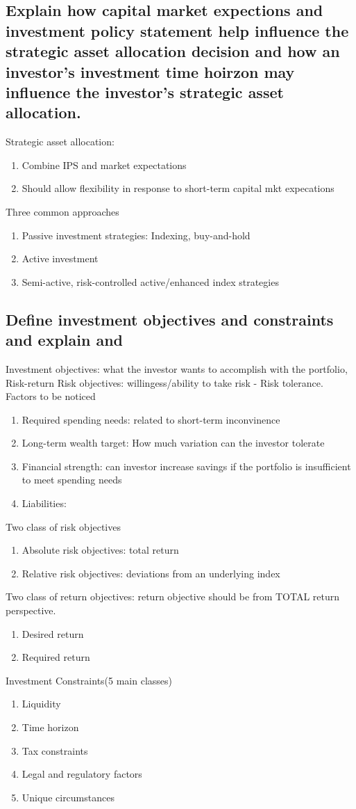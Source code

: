\documentclass{article}
\newcommand{\be}{\begin{enumerate}}
\newcommand{\ee}{\end{enumerate}}
\begin{document}
\subsection{Explain how capital market expections and investment policy statement help
influence the strategic asset allocation decision and how an investor's investment time
hoirzon may influence the investor's strategic asset allocation.}
Strategic asset allocation:
\be
    \item Combine IPS and market expectations
    \item Should allow flexibility in response to short-term capital mkt  expecations
\ee
Three common approaches
\be
    \item Passive investment strategies: Indexing, buy-and-hold
    \item Active investment
    \item Semi-active, risk-controlled active/enhanced index strategies
\ee
\subsection{Define investment objectives and constraints and explain and }
Investment objectives: what the investor wants to accomplish with the portfolio, Risk-return
Risk objectives: willingess/ability to take risk - Risk tolerance.
Factors to be noticed
\be
    \item Required spending needs: related to short-term inconvinence
    \item Long-term wealth target: How much variation can the investor tolerate
    \item Financial strength: can investor increase savings if the portfolio is insufficient to meet spending needs
    \item Liabilities:
\ee
Two class of risk objectives
\be
    \item Absolute risk objectives: total return
    \item Relative risk objectives: deviations from an underlying index
\ee
Two class of return objectives: return objective should be from TOTAL return perspective.
\be
    \item Desired return
    \item Required return
\ee
Investment Constraints(5 main classes)
\be
    \item Liquidity
    \item Time horizon
    \item Tax constraints
    \item Legal and regulatory factors
    \item Unique circumstances
\ee
\end{document}
